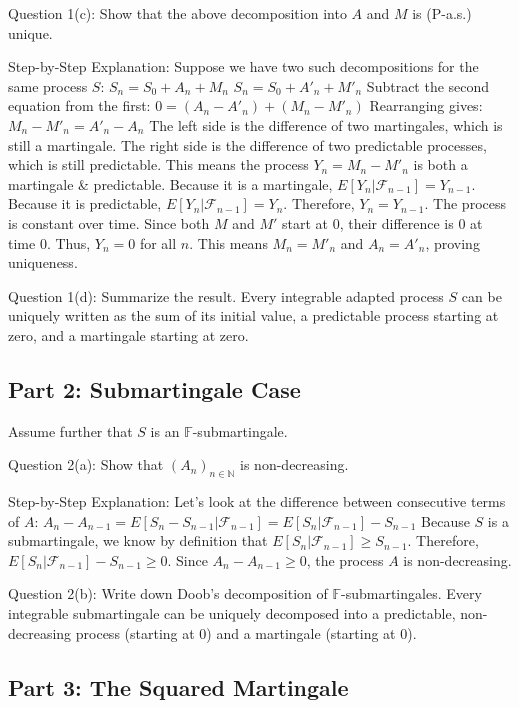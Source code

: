 Question 1(c): Show that the above decomposition into $A$ and $M$ is (P-a.s.) unique.

Step-by-Step Explanation:
Suppose we have two such decompositions for the same process $S$:
$S_n = S_0 + A_n + M_n$
$S_n = S_0 + A'_n + M'_n$
Subtract the second equation from the first:
$0 = (A_n - A'_n) + (M_n - M'_n)$
Rearranging gives:
$M_n - M'_n = A'_n - A_n$
The left side is the difference of two martingales, which is still a martingale. The right side is the difference of two predictable processes, which is still predictable. 
This means the process $Y_n = M_n - M'_n$ is both a martingale \& predictable.
Because it is a martingale, $E[Y_n | \mathcal{F}_{n-1}] = Y_{n-1}$.
Because it is predictable, $E[Y_n | \mathcal{F}_{n-1}] = Y_n$.
Therefore, $Y_n = Y_{n-1}$. The process is constant over time. Since both $M$ and $M'$ start at 0, their difference is 0 at time 0. Thus, $Y_n = 0$ for all $n$. This means $M_n = M'_n$ and $A_n = A'_n$, proving uniqueness.

Question 1(d): Summarize the result.
Every integrable adapted process $S$ can be uniquely written as the sum of its initial value, a predictable process starting at zero, and a martingale starting at zero.

\subsection{Part 2: Submartingale Case}

Assume further that $S$ is an $\mathbb{F}$-submartingale.

Question 2(a): Show that $(A_n)_{n\in\mathbb{N}}$ is non-decreasing.

Step-by-Step Explanation:
Let's look at the difference between consecutive terms of $A$:
$A_n - A_{n-1} = E[S_n - S_{n-1} | \mathcal{F}_{n-1}] = E[S_n | \mathcal{F}_{n-1}] - S_{n-1}$
Because $S$ is a submartingale, we know by definition that $E[S_n | \mathcal{F}_{n-1}] \ge S_{n-1}$.
Therefore, $E[S_n | \mathcal{F}_{n-1}] - S_{n-1} \ge 0$.
Since $A_n - A_{n-1} \ge 0$, the process $A$ is non-decreasing.

Question 2(b): Write down Doob's decomposition of $\mathbb{F}$-submartingales.
Every integrable submartingale can be uniquely decomposed into a predictable, non-decreasing process (starting at 0) and a martingale (starting at 0).

\subsection{Part 3: The Squared Martingale}

